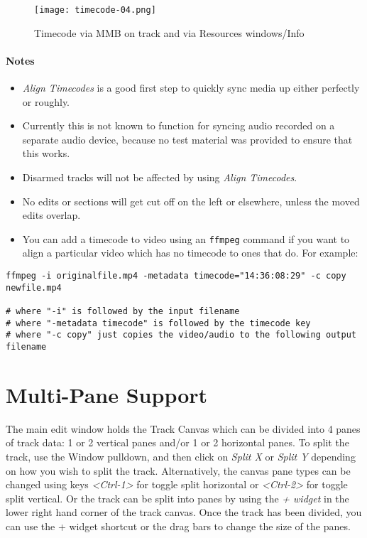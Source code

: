 \begin{figure}[ht]
	\centering
	\texttt{[image: timecode-04.png]}
	\caption{Timecode via MMB on track and via Resources windows/Info}
	\label{fig:timecode-04}
\end{figure}

\paragraph*{Notes}

\begin{itemize}
	\item \textit{Align Timecodes} is a good first step to quickly sync media up either perfectly or roughly.
	\item Currently this is not known to function for syncing audio recorded on a separate audio device,
	because no test material was provided to ensure that this works.
	\item Disarmed tracks will not be affected by using \textit{Align Timecodes}.
	\item No edits or sections will get cut off on the left or elsewhere, unless the moved edits overlap.
	\item You can add a timecode to video using an \texttt{ffmpeg} command if you want to align a particular video
	which has no timecode to ones that do. For example:
\end{itemize}

\begin{lstlisting}[style=sh]
ffmpeg -i originalfile.mp4 -metadata timecode="14:36:08:29" -c copy newfile.mp4

# where "-i" is followed by the input filename
# where "-metadata timecode" is followed by the timecode key
# where "-c copy" just copies the video/audio to the following output filename
\end{lstlisting}

\section{Multi-Pane Support}%
\label{sec:multipane_support}

The main \CGG{} edit window holds the Track Canvas which can be divided into 4 panes of track data: 1 or 2 vertical panes and/or 1 or 2 horizontal panes.  To split the track, use the Window pulldown, and then click on \textit{Split X} or \textit{Split Y} depending on how you wish to split the track.  Alternatively, the canvas pane types can be changed using keys \textit{<Ctrl-1>} for toggle split horizontal or \textit{<Ctrl-2>} for toggle split vertical.  Or the track can be split into panes by using the \textit{+ widget} in the lower right hand corner of the track canvas.  Once the track has been divided, you can use the + widget shortcut or the drag bars to change the size of the panes.

